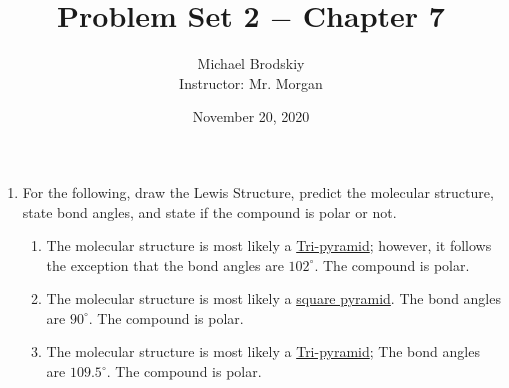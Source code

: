 \documentclass[12pt]{article}
\title{Problem Set 2 $-$ Chapter 7}
\date{November 20, 2020}
\author{Michael Brodskiy\\ \small Instructor: Mr. Morgan}
\begin{document}
\maketitle

\begin{enumerate}

  \item For the following, draw the Lewis Structure, predict the molecular structure, state bond angles, and state if the compound is polar or not.

    \begin{enumerate}

      \item {}

        \vspace{5pt}
        \begin{multicols}{2}
          \hspace{100pt}\hspace{20pt}
        The molecular structure is most likely a \underline{Tri-pyramid}; however, it follows the exception that the bond angles are $102^{\circ}$. The compound is polar.
      \end{multicols}
        \vspace{5pt}

      \item {}

        \vspace{5pt}
        \begin{multicols}{2}
          \hspace{110pt}\hspace{20pt}
          The molecular structure is most likely a \underline{square pyramid}. The bond angles are $90^{\circ}$. The compound is polar.
      \end{multicols}
        \vspace{5pt}

      \item {}

        \vspace{5pt}
        \begin{multicols}{2}
          \hspace{100pt}\hspace{20pt}
          The molecular structure is most likely a \underline{Tri-pyramid}; The bond angles are $109.5^{\circ}$. The compound is polar.
      \end{multicols}
        \vspace{5pt}


\end{enumerate}
\end{enumerate}
\end{document}
